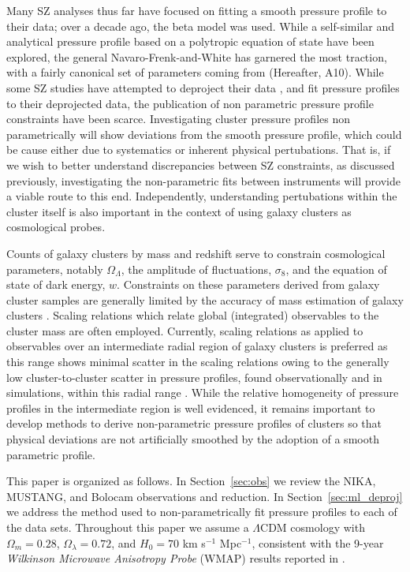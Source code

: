 \documentclass[twocolumn,traditabstract]{aa}
\begin{document}
Many SZ analyses thus far have focused on fitting a smooth pressure profile to their data; over a decade ago, the beta model
\citep{cavaliere1978} was used. While a self-similar \citep{mroczkowski2009} and analytical pressure profile based on a
polytropic equation of state \citep{bulbul2010} have been explored, the general Navaro-Frenk-and-White
\citep[gNFW][]{nagai2007} has garnered the most traction, with a fairly canonical set of parameters coming from
\citet{arnaud2010} (Hereafter, A10). While some SZ studies have attempted to deproject their data \citep[e.g.][]{sayers2013},
and fit pressure profiles to their deprojected data, the publication of non parametric pressure profile constraints have
been scarce. Investigating cluster pressure profiles non parametrically will show deviations from the smooth pressure profile,
which could be cause either due to systematics or inherent physical pertubations. That is, if we wish to better understand
discrepancies between SZ constraints, as discussed previously, investigating the non-parametric fits between instruments will
provide a viable route to this end. Independently, understanding pertubations within the cluster itself is also important in
the context of using galaxy clusters as cosmological probes.

Counts of galaxy clusters by mass and redshift serve to constrain cosmological parameters, notably $\Omega_{\Lambda}$,
the amplitude of fluctuations, $\sigma_8$, and the equation of state of dark energy, $w$. Constraints on these
parameters derived from galaxy cluster samples are generally limited by the accuracy of mass estimation of 
galaxy clusters \citep[e.g.][]{hasselfield2013, reichardt2013}. Scaling relations which relate global (integrated) observables
to the cluster mass are often employed. Currently, scaling relations as applied to observables over an intermediate radial
region of galaxy clusters is preferred as this range shows minimal scatter in the scaling relations \citep[e.g.][]{kravtsov2012}
owing to the generally low cluster-to-cluster scatter in pressure profiles, found observationally and in simulations,
within this radial range \citep[e.g.][]{borgani2004,nagai2007,arnaud2010,bonamente2012,planck2013a,sayers2013}.
While the relative homogeneity of pressure profiles in the intermediate region is well evidenced, it remains important to
develop methods to derive non-parametric pressure profiles of clusters so that physical deviations are not artificially
smoothed by the adoption of a smooth parametric profile. 

This paper is organized as follows. In Section~\ref{sec:obs} we review the NIKA, MUSTANG, and Bolocam observations and reduction. 
In Section~\ref{sec:ml_deproj} we address the method used to non-parametrically fit pressure profiles to each of the data sets.
Throughout this paper we assume a $\Lambda$CDM cosmology with $\Omega_m = 0.28$, $\Omega_{\lambda} = 0.72$, and $H_0 = 70$ 
km s$^{-1}$ Mpc$^{-1}$, consistent with the 9-year \emph{Wilkinson Microwave Anisotropy Probe} (WMAP) results reported
in \cite{hinshaw2013}.
\end{document}

